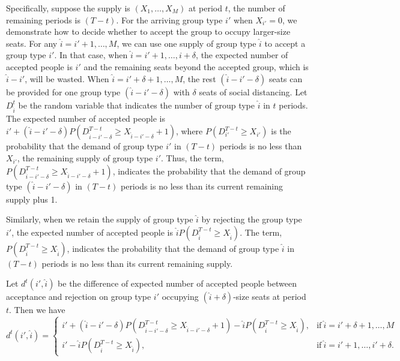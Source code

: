 Specifically, suppose the supply is $(X_1, \ldots, X_M)$ at period $t$, the number of remaining periods is $(T-t)$. For the arriving group type ${i{'}}$ when $X_{i{'}} = 0$, we demonstrate how to decide whether to accept the group to occupy larger-size seats. For any $\hat{i}={i{'}}+1, \ldots, M$, we can use one supply of group type $\hat{i}$ to accept a group type ${i{'}}$. In that case, when $\hat{i} = {i{'}}+1, \ldots, i+\delta$, the expected number of accepted people is ${i{'}}$ and the remaining seats beyond the accepted group, which is $\hat{i}-{i{'}}$, will be wasted. When $\hat{i} = {i{'}}+\delta+1, \ldots, M$, the rest $(\hat{i}-{i{'}}-\delta)$ seats can be provided for one group type $(\hat{i}-{i{'}}-\delta)$ with $\delta$ seats of social distancing. Let $D_{\hat{i}}^{t}$ be the random variable that indicates the number of group type $\hat{i}$ in $t$ periods. The expected number of accepted people is ${i{'}} + (\hat{i}-{i{'}}-\delta)P(D_{\hat{i}-{i{'}}-\delta}^{T-t} \geq X_{\hat{i}-{i{'}}-\delta}+1)$, where $P(D_{i{'}}^{T-t} \geq X_{i{'}})$ is the probability that the demand of group type ${i{'}}$ in $(T-t)$ periods is no less than $X_{i{'}}$, the remaining supply of group type ${i{'}}$. Thus, the term, $P(D_{\hat{i}-{i{'}}-\delta}^{T-t} \geq X_{\hat{i}-{i{'}}-\delta}+1)$, indicates the probability that the demand of group type $(\hat{i}-{i{'}}-\delta)$ in $(T-t)$ periods is no less than its current remaining supply plus 1.

Similarly, when we retain the supply of group type $\hat{i}$ by rejecting the group type ${i{'}}$, the expected number of accepted people is $\hat{i} P(D_{\hat{i}}^{T-t} \geq X_{\hat{i}})$. The term, $P(D_{\hat{i}}^{T-t} \geq X_{\hat{i}})$, indicates the probability that the demand of group type $\hat{i}$ in $(T-t)$ periods is no less than its current remaining supply.

Let $d^{t}({i{'}},\hat{i})$ be the difference of expected number of accepted people between acceptance and rejection on group type ${i{'}}$ occupying $(\hat{i}+\delta)$-size seats at period $t$. Then we have
\begin{equation*}
	d^{t}({i{'}},\hat{i}) = \begin{cases}
    {i{'}} + (\hat{i}-{i{'}}-\delta)P(D_{\hat{i}-{i{'}}-\delta}^{T-t} \geq X_{\hat{i}-{i{'}}-\delta}+1) - \hat{i} P(D_{\hat{i}}^{T-t} \geq X_{\hat{i}}), &\text{if}~ \hat{i} = {i{'}}+\delta+1, \ldots, M \\
    {i{'}} - \hat{i} P(D_{\hat{i}}^{T-t} \geq X_{\hat{i}}), &\text{if}~ \hat{i} = {i{'}}+1, \ldots, {i{'}}+\delta.
		\end{cases}
\end{equation*}

